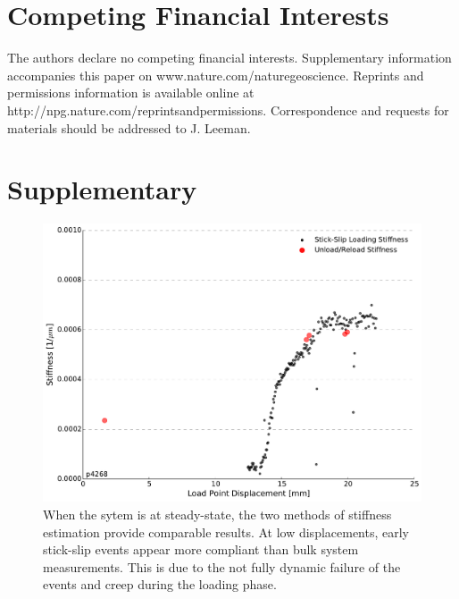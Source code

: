 \documentclass[11pt]{article}
\begin{document}
\section{Competing Financial Interests}
The authors declare no competing financial interests. Supplementary information
accompanies this paper on www.nature.com/naturegeoscience. Reprints and permissions information is
available online at http://npg.nature.com/reprintsandpermissions. Correspondence
and requests for materials should be addressed to J. Leeman.

\section{Supplementary}

\begin{figure}
    \centering
        \includegraphics[scale=0.4]{../Figures/Fig_Stiffness_Methods/Stiffness_Methods.pdf}
       \caption{When the sytem is at steady-state, the two methods of stiffness
       estimation provide comparable results. At low displacements, early stick-slip
       events appear more compliant than bulk system measurements. This is due to the
       not fully dynamic failure of the events and creep during the loading phase.}
      \label{Figure:Stiffness Methods}
\end{figure}
\end{document}
